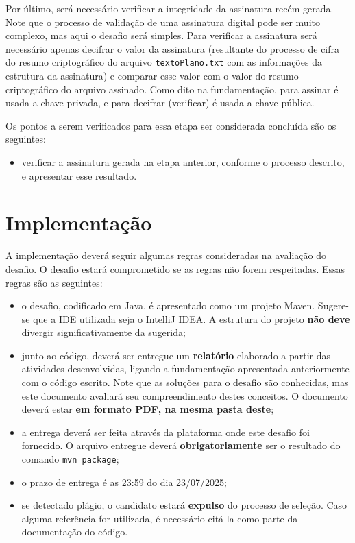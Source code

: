 \documentclass{article}
\begin{document}
Por último, será necessário verificar a integridade da assinatura
recém-gerada. Note que o processo de validação de uma assinatura digital pode
ser muito complexo, mas aqui o desafio será simples. Para verificar
a assinatura será necessário apenas decifrar o valor da assinatura (resultante
do processo de cifra do resumo criptográfico do arquivo \texttt{textoPlano.txt}
com as informações da estrutura da assinatura) e comparar esse valor com
o valor do resumo criptográfico do arquivo assinado. Como dito na
fundamentação, para assinar é usada a chave privada, e para decifrar
(verificar) é usada a chave pública.

Os pontos a serem verificados para essa etapa ser considerada concluída são os
seguintes:

\begin{itemize}
  \item verificar a assinatura gerada na etapa anterior, conforme o
      processo descrito, e apresentar esse resultado.
\end{itemize}

\section{Implementação}\label{sec:impl}

A implementação deverá seguir algumas regras consideradas na avaliação do
desafio. O desafio estará comprometido se as regras não forem
respeitadas. Essas regras são as seguintes:

\begin{itemize}
  \item o desafio, codificado em Java, é apresentado como um projeto
      Maven. Sugere-se que a IDE utilizada seja o IntelliJ IDEA\@. A estrutura
        do projeto \textbf{não deve} divergir significativamente da sugerida;

  \item junto ao código, deverá ser entregue um \textbf{relatório} elaborado
      a partir das atividades desenvolvidas, ligando a fundamentação
        apresentada anteriormente com o código escrito. Note que as soluções
        para o desafio são conhecidas, mas este documento avaliará seu
        compreendimento destes conceitos. O documento deverá estar \textbf{em
        formato PDF, na mesma pasta deste};

  \item a entrega deverá ser feita através da plataforma onde este desafio foi
      fornecido. O arquivo entregue deverá \textbf{obrigatoriamente} ser
        o resultado do comando \texttt{mvn package};

  \item o prazo de entrega é as 23:59 do dia 23/07/2025;

  \item se detectado plágio, o candidato estará \textbf{expulso} do processo de
      seleção. Caso alguma referência for utilizada, é necessário citá-la como
        parte da documentação do código.
\end{itemize}
\end{document}
